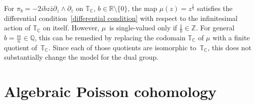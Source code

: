 \documentclass[pdftex]{sigma}
\numberwithin{equation}{section}
\begin{document}
\begin{Example}
For $\pi_b=-2ibz\bar{z}\partial_z\wedge\partial_{\bar{z}}$ on ${\mathbb T}_{\mathbb C}$, $b\in{\mathbb R}\setminus\{0\}$, the map $\mu(z)=z^{\frac{1}{b}}$ satisf\/ies the dif\/ferential condition~\eqref{differential condition} with respect to the inf\/initesimal action of ${\mathbb T}_{\mathbb C}$ on itself. However, $\mu$~is single-valued only if $\frac{1}{b}\in{\mathbb Z}$. For general $b=\frac{m}{n}\in\mathbb Q$, this can be remedied by replacing the codomain ${\mathbb T}_{\mathbb C}$ of $\mu$ with a f\/inite quotient of~${\mathbb T}_{\mathbb C}$. Since each of those quotients are isomorphic to~${\mathbb T}_{\mathbb C}$, this does not substantially change the model for the dual group.
\end{Example}

\section{Algebraic Poisson cohomology}
\end{document}
